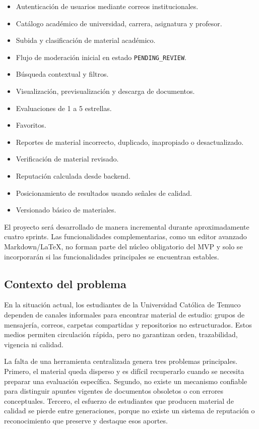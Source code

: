 \documentclass[12pt,a4paper]{article}
\begin{document}
\begin{itemize}
    \item Autenticación de usuarios mediante correos institucionales.
    \item Catálogo académico de universidad, carrera, asignatura y profesor.
    \item Subida y clasificación de material académico.
    \item Flujo de moderación inicial en estado \texttt{PENDING\_REVIEW}.
    \item Búsqueda contextual y filtros.
    \item Visualización, previsualización y descarga de documentos.
    \item Evaluaciones de 1 a 5 estrellas.
    \item Favoritos.
    \item Reportes de material incorrecto, duplicado, inapropiado o desactualizado.
    \item Verificación de material revisado.
    \item Reputación calculada desde backend.
    \item Posicionamiento de resultados usando señales de calidad.
    \item Versionado básico de materiales.
\end{itemize}

El proyecto será desarrollado de manera incremental durante aproximadamente cuatro sprints. Las funcionalidades complementarias, como un editor avanzado Markdown/LaTeX, no forman parte del núcleo obligatorio del MVP y solo se incorporarán si las funcionalidades principales se encuentran estables.

\subsection{Contexto del problema}

En la situación actual, los estudiantes de la Universidad Católica de Temuco dependen de canales informales para encontrar material de estudio: grupos de mensajería, correos, carpetas compartidas y repositorios no estructurados. Estos medios permiten circulación rápida, pero no garantizan orden, trazabilidad, vigencia ni calidad.

La falta de una herramienta centralizada genera tres problemas principales. Primero, el material queda disperso y es difícil recuperarlo cuando se necesita preparar una evaluación específica. Segundo, no existe un mecanismo confiable para distinguir apuntes vigentes de documentos obsoletos o con errores conceptuales. Tercero, el esfuerzo de estudiantes que producen material de calidad se pierde entre generaciones, porque no existe un sistema de reputación o reconocimiento que preserve y destaque esos aportes.
\end{document}
